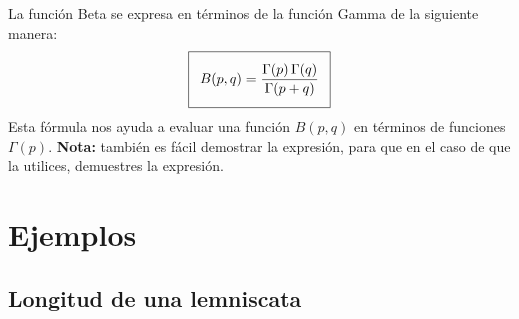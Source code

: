 La función Beta se expresa en términos de la función Gamma de la siguiente manera:
\begin{align}
\addtolength{\fboxsep}{5pt}\boxed{B(p, q) = \dfrac{\Gamma(p) \, \Gamma(q)}{\Gamma (p + q)}}
\label{eq:ecuacion_07_01}
\end{align}
Esta fórmula nos ayuda a evaluar una función $B (p, q)$ en términos de funciones $\Gamma (p)$. \textbf{Nota: } también es fácil demostrar la expresión, para que en el caso de que la utilices, demuestres la expresión.

\section{Ejemplos}

\subsection{Longitud de una lemniscata}

